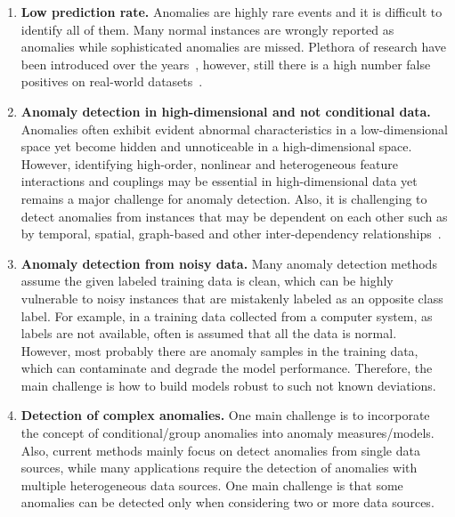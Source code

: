 \begin{enumerate}
    \item \textbf{Low prediction rate.} Anomalies are highly rare events and it is difficult to identify all of them. Many normal instances are wrongly reported as anomalies while sophisticated anomalies are missed. Plethora of research have been introduced over the years~\cite{liu2008isolation,breunig2000lof}, however, still there is a high number false positives on real-world datasets~\cite{du2017deeplog,campos2016evaluation}. 
    \item \textbf{Anomaly detection in high-dimensional and not conditional data.} Anomalies often exhibit evident abnormal characteristics in a low-dimensional space yet become hidden and unnoticeable in a high-dimensional space. However, identifying high-order, nonlinear and heterogeneous feature interactions and couplings may be essential in high-dimensional data yet remains a major challenge for anomaly detection. Also, it is challenging to detect anomalies from instances that may be dependent on each other such as by temporal, spatial, graph-based and other inter-dependency relationships~\cite{pang2020deep}.
    \item \textbf{Anomaly detection from noisy data.} Many anomaly detection methods assume the given labeled training data is clean, which can be highly vulnerable to noisy instances that are mistakenly labeled as an opposite class label. For example, in a training data collected from a computer system, as labels are not available, often is assumed that all the data is normal. However, most probably there are anomaly samples in the training data, which can contaminate and degrade the model performance. Therefore, the main challenge is how to build models robust to such not known deviations. 
    \item \textbf{Detection of complex anomalies.} One main challenge  is to incorporate the concept of conditional/group anomalies into anomaly measures/models. Also, current methods mainly focus on detect anomalies from single data sources, while many applications require the detection of anomalies with multiple heterogeneous data sources. One main challenge is that some anomalies can be detected only when considering two or more data sources.
\end{enumerate}

